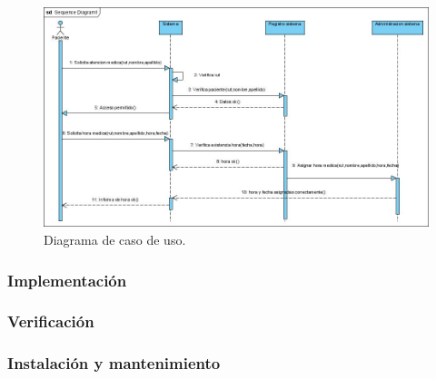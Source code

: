             \begin{figure}[h]
             \centering
              \includegraphics[scale=.5]{lib/assets/secuencia}
              \caption{Diagrama de caso de uso.}
              \label{metodologia}
            \end{figure}
          \subsubsection{Implementación}
          \subsubsection{Verificación}
          \subsubsection{Instalación y mantenimiento}
